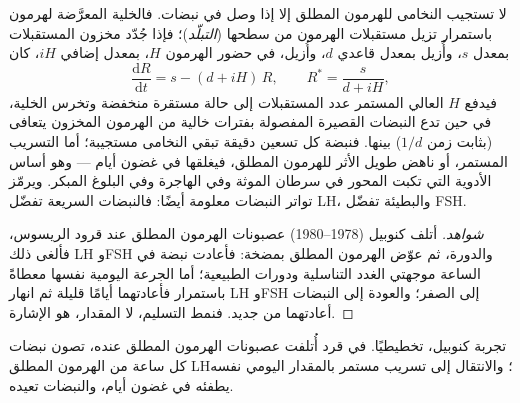 \begin{proposition}\label{prop:b2:reproductive-hormones:pulses}
لا تستجيب النخامى للهرمون المطلق إلا إذا وصل في نبضات. فالخلية
المعرَّضة لهرمون باستمرار تزيل مستقبلات الهرمون
من سطحها (\emph{التبلّد})؛ فإذا جُدّد مخزون المستقبلات
بمعدل $s$، وأُزيل بمعدل قاعدي $d$، وأُزيل، في
حضور الهرمون $H$، بمعدل إضافي $iH$، كان
\[
\frac{\mathrm{d}R}{\mathrm{d}t} = s - (d + iH)\,R, \qquad R^* = \frac{s}{d + iH},
\]
فيدفع $H$ العالي المستمر عدد المستقبلات إلى حالة مستقرة
منخفضة وتخرس الخلية، في حين تدع النبضات القصيرة المفصولة
بفترات خالية من الهرمون المخزون يتعافى
(بثابت زمن $1/d$) بينها. فنبضة كل تسعين
دقيقة تبقي النخامى مستجيبة؛ أما التسريب المستمر، أو
ناهض طويل الأثر للهرمون المطلق، فيغلقها في غضون أيام --- وهو أساس
الأدوية التي تكبت المحور في سرطان الموثة وفي  الهاجرة
وفي البلوغ المبكر. ويرمّز تواتر النبضات معلومة أيضًا:
فالنبضات السريعة تفضّل LH، والبطيئة تفضّل FSH.
\end{proposition}
\begin{proof}[شواهد]
أتلف كنوبيل (1978--1980) عصبونات الهرمون المطلق عند قرود الريسوس،
فألغى ذلك LH وFSH والدورة، ثم عوّض الهرمون المطلق
بمضخة: فأعادت نبضة في الساعة موجهتي الغدد التناسلية ودورات
 الطبيعية؛ أما الجرعة اليومية نفسها معطاةً باستمرار فأعادتهما
أيامًا قليلة ثم انهار LH وFSH إلى الصفر؛ والعودة
إلى النبضات أعادتهما من جديد. فنمط التسليم، لا
المقدار، هو الإشارة.
\end{proof}

\begin{omfigure}

{\small تجربة كنوبيل، تخطيطيًا. في قرد أُتلفت عصبونات
الهرمون المطلق عنده، تصون نبضات كل ساعة من الهرمون المطلق LH؛
والانتقال إلى تسريب مستمر بالمقدار اليومي نفسه
يطفئه في غضون أيام، والنبضات تعيده.}
\end{omfigure}

